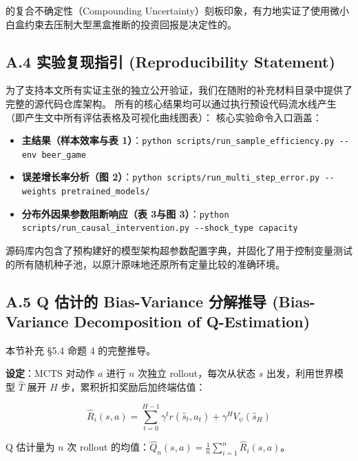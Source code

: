 \documentclass[UTF8]{ctexart}
\begin{document}
的复合不确定性（Compounding
Uncertainty）刻板印象，有力地实证了使用微小白盒约束去压制大型黑盒推断的投资回报是决定性的。

\hypertarget{a.4-ux5b9eux9a8cux590dux73b0ux6307ux5f15-reproducibility-statement}{%
\subsection{A.4 实验复现指引 (Reproducibility
Statement)}\label{a.4-ux5b9eux9a8cux590dux73b0ux6307ux5f15-reproducibility-statement}}

为了支持本文所有实证主张的独立公开验证，我们在随附的补充材料目录中提供了完整的源代码仓库架构。
所有的核心结果均可以通过执行预设代码流水线产生（即产生文中所有评估表格及可视化曲线图表）：
核心实验命令入口涵盖：
\begin{itemize}
\item \textbf{主结果（样本效率与表 1）}：\texttt{python scripts/run\_sample\_efficiency.py -\/-env beer\_game}
\item \textbf{误差增长率分析（图 2）}：\texttt{python scripts/run\_multi\_step\_error.py -\/-weights pretrained\_models/}
\item \textbf{分布外因果参数阻断响应（表 3与图 3）}：\texttt{python scripts/run\_causal\_intervention.py -\/-shock\_type capacity}
\end{itemize}

源码库内包含了预构建好的模型架构超参数配置字典，并固化了用于控制变量测试的所有随机种子池，以原汁原味地还原所有定量比较的准确环境。

\hypertarget{a.5-q-ux4f30ux8ba1ux7684-bias-variance-ux5206ux89e3ux63a8ux5bfc-bias-variance-decomposition-of-q-estimation}{%
\subsection{A.5 Q 估计的 Bias-Variance 分解推导 (Bias-Variance
Decomposition of
Q-Estimation)}\label{a.5-q-ux4f30ux8ba1ux7684-bias-variance-ux5206ux89e3ux63a8ux5bfc-bias-variance-decomposition-of-q-estimation}}

本节补充 §5.4 命题 4 的完整推导。

\textbf{设定}：MCTS 对动作 \(a\) 进行 \(n\) 次独立 rollout，每次从状态
\(s\) 出发，利用世界模型 \(\hat{T}\) 展开 \(H\)
步，累积折扣奖励后加终端估值：

\[\hat{R}_i(s,a) = \sum_{t=0}^{H-1} \gamma^t r(\hat{s}_t, \hat{a}_t) + \gamma^H V_\psi(\hat{s}_H)\]

Q 估计量为 \(n\) 次 rollout
的均值：\(\hat{Q}_n(s,a) = \frac{1}{n} \sum_{i=1}^n \hat{R}_i(s,a)\)。
\end{document}
